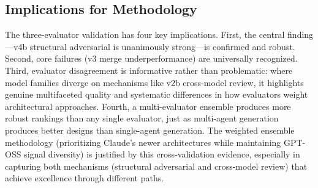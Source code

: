 \documentclass[conference]{IEEEtran}
\begin{document}
\subsection{Implications for Methodology}
The three-evaluator validation has four key implications. First, the central finding---v4b structural adversarial is unanimously strong---is confirmed and robust. Second, core failures (v3 merge underperformance) are universally recognized. Third, evaluator disagreement is informative rather than problematic: where model families diverge on mechanisms like v2b cross-model review, it highlights genuine multifaceted quality and systematic differences in how evaluators weight architectural approaches. Fourth, a multi-evaluator ensemble produces more robust rankings than any single evaluator, just as multi-agent generation produces better designs than single-agent generation. The weighted ensemble methodology (prioritizing Claude's newer architectures while maintaining GPT-OSS signal diversity) is justified by this cross-validation evidence, especially in capturing both mechanisms (structural adversarial and cross-model review) that achieve excellence through different paths.
\end{document}
